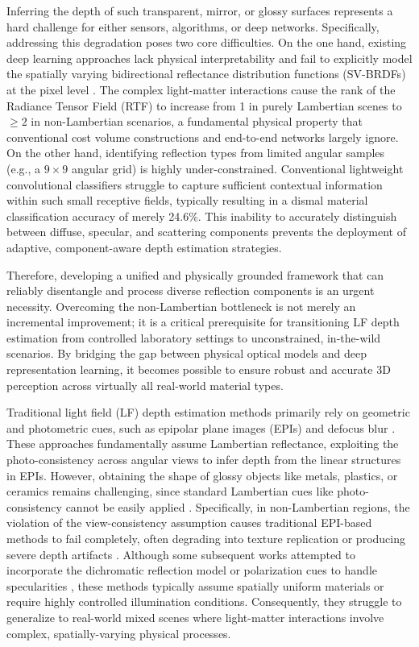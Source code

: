 Inferring the depth of such transparent, mirror, or glossy surfaces represents a hard challenge for either sensors, algorithms, or deep networks. Specifically, addressing this degradation poses two core difficulties. On the one hand, existing deep learning approaches lack physical interpretability and fail to explicitly model the spatially varying bidirectional reflectance distribution functions (SV-BRDFs) at the pixel level . The complex light-matter interactions cause the rank of the Radiance Tensor Field (RTF) to increase from 1 in purely Lambertian scenes to \(\geq 2\) in non-Lambertian scenarios, a fundamental physical property that conventional cost volume constructions and end-to-end networks largely ignore. On the other hand, identifying reflection types from limited angular samples (e.g., a \(9 \times 9\) angular grid) is highly under-constrained. Conventional lightweight convolutional classifiers struggle to capture sufficient contextual information within such small receptive fields, typically resulting in a dismal material classification accuracy of merely 24.6\%. This inability to accurately distinguish between diffuse, specular, and scattering components prevents the deployment of adaptive, component-aware depth estimation strategies.

Therefore, developing a unified and physically grounded framework that can reliably disentangle and process diverse reflection components is an urgent necessity. Overcoming the non-Lambertian bottleneck is not merely an incremental improvement; it is a critical prerequisite for transitioning LF depth estimation from controlled laboratory settings to unconstrained, in-the-wild scenarios. By bridging the gap between physical optical models and deep representation learning, it becomes possible to ensure robust and accurate 3D perception across virtually all real-world material types.

Traditional light field (LF) depth estimation methods primarily rely on geometric and photometric cues, such as epipolar plane images (EPIs) and defocus blur . These approaches fundamentally assume Lambertian reflectance, exploiting the photo-consistency across angular views to infer depth from the linear structures in EPIs. However, obtaining the shape of glossy objects like metals, plastics, or ceramics remains challenging, since standard Lambertian cues like photo-consistency cannot be easily applied . Specifically, in non-Lambertian regions, the violation of the view-consistency assumption causes traditional EPI-based methods to fail completely, often degrading into texture replication or producing severe depth artifacts . Although some subsequent works attempted to incorporate the dichromatic reflection model or polarization cues to handle specularities , these methods typically assume spatially uniform materials or require highly controlled illumination conditions. Consequently, they struggle to generalize to real-world mixed scenes where light-matter interactions involve complex, spatially-varying physical processes.

